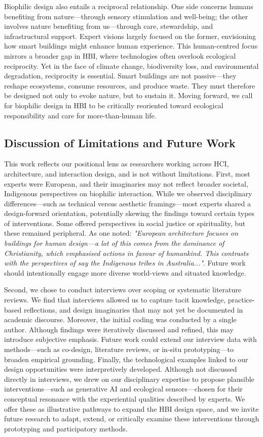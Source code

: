 Biophilic design also entails a reciprocal relationship. One side concerns humans benefiting from nature---through sensory stimulation and well-being; the other involves nature benefiting from us---through care, stewardship, and infrastructural support. Expert visions largely focused on the former, envisioning how smart buildings might enhance human experience. This human-centred focus mirrors a broader gap in HBI, where technologies often overlook ecological reciprocity. Yet in the face of climate change, biodiversity loss, and environmental degradation, reciprocity is essential. Smart buildings are not passive---they reshape ecosystems, consume resources, and produce waste. They must therefore be designed not only to evoke nature, but to sustain it. Moving forward, we call for biophilic design in HBI to be critically reoriented toward ecological responsibility and care for more-than-human life.

\subsection{Discussion of Limitations and Future Work}
This work reflects our positional lens as researchers working across HCI, architecture, and interaction design, and is not without limitations. First, most experts were European, and their imaginaries may not reflect broader societal, Indigenous perspectives on biophilic interaction. While we observed disciplinary differences---such as technical versus aesthetic framings---most experts shared a design-forward orientation, potentially skewing the findings toward certain types of interventions. Some offered perspectives in social justice or spirituality, but these remained peripheral. As one noted: \textit{"European architecture focuses on buildings for human design---a lot of this comes from the dominance of Christianity, which emphasised actions in favour of humankind. This contrasts with the perspectives of say the Indigenous tribes in Australia..."}. Future work should intentionally engage more diverse world-views and situated knowledge.

Second, we chose to conduct interviews over scoping or systematic literature reviews. We find that interviews allowed us to capture tacit knowledge, practice-based reflections, and design imaginaries that may not yet be documented in academic discourse. Moreover, the initial coding was conducted by a single author. Although findings were iteratively discussed and refined, this may introduce subjective emphasis. Future work could extend our interview data with methods---such as co-design, literature reviews, or in-situ prototyping---to broaden empirical grounding. Finally, the technological examples linked to our design opportunities were interpretively developed. Although not discussed directly in interviews, we drew on our disciplinary expertise to propose plausible interventions---such as generative AI and ecological sensors---chosen for their conceptual resonance with the experiential qualities described by experts. We offer these as illustrative pathways to expand the HBI design space, and we invite future research to adapt, extend, or critically examine these interventions through prototyping and participatory methods.




 